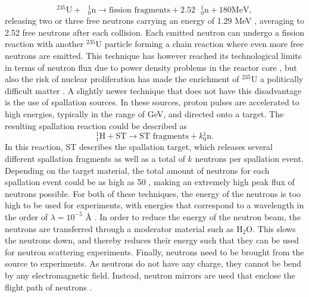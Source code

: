 \begin{equation}
	^{235}\textrm{U} + \textrm{ } ^1_0\textrm{n}  \rightarrow \textrm{fission fragments} + 2.52 \textrm{ } ^1_0 \textrm{n} + 180 \textrm{MeV},
\end{equation}
releasing two or three free neutrons carrying an energy of 1.29 MeV \cite{neutronscattering_book}, averaging to 2.52 free neutrons after each collision. Each emitted neutron can undergo a fission reaction with another $^{235}$U particle forming a chain reaction where even more free neutrons are emitted. This technique has however reached its technological limits in terms of neutron flux due to power density problems in the reactor core \cite{spallationbauer}\cite{sourcesbauer}, but also the risk of nuclear proliferation has made the enrichment of $^{235}$U a politically difficult matter \cite{sourcesbauer}. A slightly newer technique that does not have this disadvantage is the use of spallation sources. In these sources, proton pulses are accelerated to high energies, typically in the range of GeV, and directed onto a target. The resulting spallation reaction could be described as 
\begin{equation}
	^1_1\textrm{H}  + \textrm{ST} \rightarrow \textrm{ST fragments} + k \textrm{} ^1_0 \textrm{n}.
\end{equation}
In this reaction, ST describes the spallation target, which releases several different spallation fragments as well as a total of $k$ neutrons per spallation event. Depending on the target material, the total amount of neutrons for each spallation event could be as high as 50 \cite{neutronscattering_book}, making an extremely high peak flux of neutrons possible. For both of these techniques, the energy of the neutrons is too high to be used for experiments, with energies that correspond to a wavelength in the order of $\lambda = 10^{-5}$ Å \cite{neutronscattering_book}. In order to reduce the energy of the neutron beam, the neutrons are transferred through a moderator material such as H$_\textrm{2}$O. This slows the neutrons down, and thereby reduces their energy such that they can be used for neutron scattering experiments. Finally, neutrons need to be brought from the source to experiments. As neutrons do not have any charge, they cannot be bend by any electromagnetic field. Instead, neutron mirrors are used that enclose the flight path of neutrons \cite{neutronbookmatrac}. 
